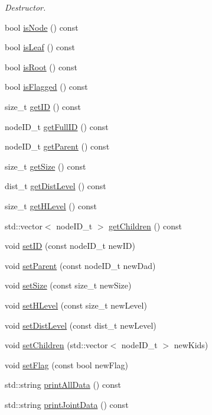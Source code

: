 \begin{DoxyCompactItemize}
\begin{DoxyCompactList}\small\item\em \-Destructor. \end{DoxyCompactList}\item 
bool \hyperlink{classWHnode_a1d982582c157b778137c122154473723}{is\-Node} () const 
\item 
bool \hyperlink{classWHnode_a802bccb8cdffd673b8d1b21a396e5878}{is\-Leaf} () const 
\item 
bool \hyperlink{classWHnode_a2b29bf7de21863c81c87d05b1f266605}{is\-Root} () const 
\item 
bool \hyperlink{classWHnode_a645b990796d424dd2f04261d5b037802}{is\-Flagged} () const 
\item 
size\-\_\-t \hyperlink{classWHnode_ad8519b89def63d16bccd465419633a4e}{get\-I\-D} () const 
\item 
node\-I\-D\-\_\-t \hyperlink{classWHnode_ab66d1a475a608ecf70422481bad8ad99}{get\-Full\-I\-D} () const 
\item 
node\-I\-D\-\_\-t \hyperlink{classWHnode_a55c49f56296d4d2d51036bb45bfbab55}{get\-Parent} () const 
\item 
size\-\_\-t \hyperlink{classWHnode_aa59d9547bf69a755b4614f723ce3be0c}{get\-Size} () const 
\item 
dist\-\_\-t \hyperlink{classWHnode_a00e0771d724e149ae65ba6295cf1b01d}{get\-Dist\-Level} () const 
\item 
size\-\_\-t \hyperlink{classWHnode_a5435fb6cfeda89942fc8c3c51ff88110}{get\-H\-Level} () const 
\item 
std\-::vector$<$ node\-I\-D\-\_\-t $>$ \hyperlink{classWHnode_aec798406a15b57dbfdb4905f37fc67be}{get\-Children} () const 
\item 
void \hyperlink{classWHnode_a9dc9cf98a969f06c90c3230c1278bf6b}{set\-I\-D} (const node\-I\-D\-\_\-t new\-I\-D)
\item 
void \hyperlink{classWHnode_a2732c162f9931ba9f420a91a09856cb7}{set\-Parent} (const node\-I\-D\-\_\-t new\-Dad)
\item 
void \hyperlink{classWHnode_a83346cd68ffe58e1d8b1a0a97ad55de6}{set\-Size} (const size\-\_\-t new\-Size)
\item 
void \hyperlink{classWHnode_a7a21ce48661275bef2d1e26f55363f7c}{set\-H\-Level} (const size\-\_\-t new\-Level)
\item 
void \hyperlink{classWHnode_abd2afa949e79a458ea398091d4f9e5dc}{set\-Dist\-Level} (const dist\-\_\-t new\-Level)
\item 
void \hyperlink{classWHnode_a668438bcb901a61bf9383e2fc67d41b1}{set\-Children} (std\-::vector$<$ node\-I\-D\-\_\-t $>$ new\-Kids)
\item 
void \hyperlink{classWHnode_a9f609fb6d884f81e18129f2f8e316134}{set\-Flag} (const bool new\-Flag)
\item 
std\-::string \hyperlink{classWHnode_a2dd60e9c6d84a5aa6200a55628954e1c}{print\-All\-Data} () const 
\item 
std\-::string \hyperlink{classWHnode_aa4c36331970b9f903f3e750e7ec8bfa0}{print\-Joint\-Data} () const 
\end{DoxyCompactItemize}


